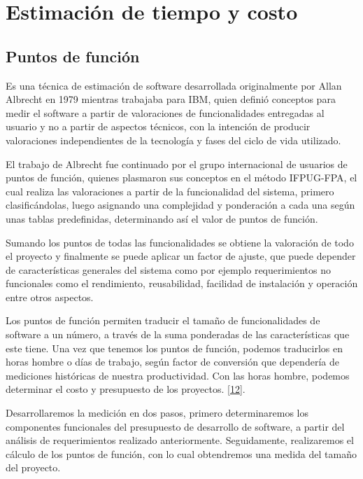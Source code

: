 

\chapter{Estimación de tiempo y costo} \label{cap:cinco}

\section{Puntos de función}

Es una técnica de estimación de software desarrollada originalmente por Allan Albrecht en 1979 mientras trabajaba para IBM, quien definió conceptos para medir el software a partir de valoraciones de funcionalidades entregadas al usuario y no a partir de aspectos técnicos, con la intención de producir valoraciones independientes de la tecnología y fases del ciclo de vida utilizado.

El trabajo de Albrecht fue continuado por el grupo internacional de usuarios de puntos de función, quienes plasmaron sus conceptos en el método IFPUG-FPA, el cual realiza las valoraciones a partir de la funcionalidad del sistema, primero clasificándolas, luego asignando una complejidad y ponderación a cada una según unas tablas predefinidas, determinando así el valor de puntos de función.

Sumando los puntos de todas las funcionalidades se obtiene la valoración de todo el proyecto y finalmente se puede aplicar un factor de ajuste, que puede depender de características generales del sistema como por ejemplo requerimientos no funcionales como el rendimiento, reusabilidad, facilidad de instalación y operación entre otros aspectos.

Los puntos de función permiten traducir el tamaño de funcionalidades de software a un número, a través de la suma ponderadas de las características que este tiene. Una vez que tenemos los puntos de función, podemos traducirlos en horas hombre o días de trabajo, según factor de conversión que dependería de mediciones históricas de nuestra productividad. Con las horas hombre, podemos determinar el costo y presupuesto de los proyectos. \hyperlink{b12}{[12]}.

\newpage

Desarrollaremos la medición en dos pasos, primero determinaremos los componentes funcionales del presupuesto de desarrollo de software, a partir del análisis de requerimientos realizado anteriormente. Seguidamente, realizaremos el cálculo de los puntos de función, con lo cual obtendremos una medida del tamaño del proyecto.\\

